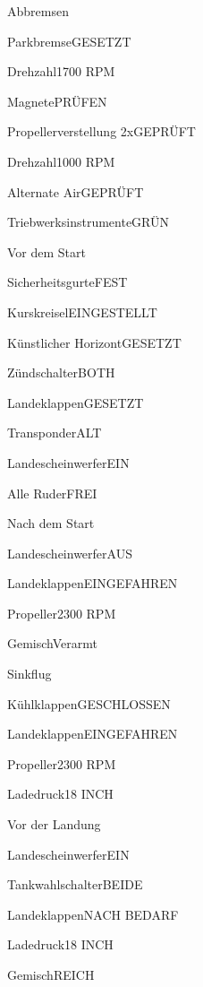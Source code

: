 \documentclass[12pt]{article}
\begin{document}
  \begin{checklist}{Abbremsen}
    \item{Parkbremse}{GESETZT}
    \item{Drehzahl}{1700 RPM}
    \item{Magnete}{PRÜFEN}
    \item{Propellerverstellung 2x}{GEPRÜFT}
    \item{Drehzahl}{1000 RPM}
    \item{Alternate Air}{GEPRÜFT}
    \item{Triebwerksinstrumente}{GRÜN}
  \end{checklist}

  \begin{checklist}{Vor dem Start}
    \item{Sicherheitsgurte}{FEST}
    \item{Kurskreisel}{EINGESTELLT}
    \item{Künstlicher Horizont}{GESETZT}
    \item{Zündschalter}{BOTH}
    \item{Landeklappen}{GESETZT}
    \item{Transponder}{ALT}
    \item{Landescheinwerfer}{EIN}
    \item{Alle Ruder}{FREI}
  \end{checklist}

  \begin{checklist}{Nach dem Start}
    \item{Landescheinwerfer}{AUS}
    \item{Landeklappen}{EINGEFAHREN}
    \item{Propeller}{2300 RPM}
    \item{Gemisch}{Verarmt}
  \end{checklist}

  \begin{checklist}{Sinkflug}
    \item{Kühlklappen}{GESCHLOSSEN}
    \item{Landeklappen}{EINGEFAHREN}
    \item{Propeller}{2300 RPM}
    \item{Ladedruck}{18 INCH}
  \end{checklist}

  \begin{checklist}{Vor der Landung}
    \item{Landescheinwerfer}{EIN}
    \item{Tankwahlschalter}{BEIDE}
    \item{Landeklappen}{NACH BEDARF}
    \item{Ladedruck}{18 INCH}
    \item{Gemisch}{REICH}
  \end{checklist}
\end{document}
